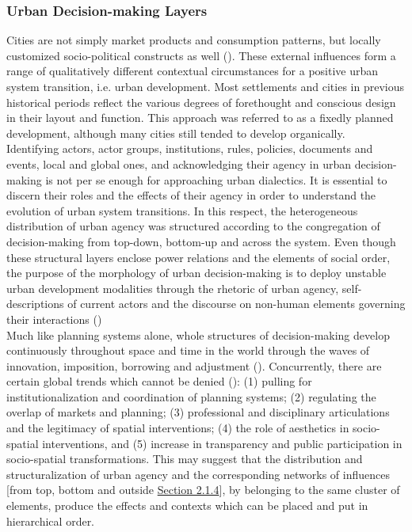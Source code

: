 \documentclass[11pt]{report}
\begin{document}
{{{\subsubsection{Urban Decision-making Layers}

Cities are not simply market products and consumption patterns, but locally customized socio-political constructs as well (\href{marcuse}{\citealt{marcus_spatial_2007}}). These external influences form a range of qualitatively different contextual circumstances for a positive urban system transition, i.e. urban development. Most settlements and cities in previous historical periods reflect the various degrees of forethought and conscious design in their layout and function. This approach was referred to as a fixedly planned development, although many cities still tended to develop organically.
\\

Identifying actors, actor groups, institutions, rules, policies, documents and events, local and global ones, and acknowledging their agency in urban decision-making is not per se enough for approaching urban dialectics.
It is essential to discern their roles and the effects of their agency in order to understand the evolution of urban system transitions.
In this respect, the heterogeneous distribution of urban agency was structured according to the congregation of decision-making from top-down, bottom-up and across the system.
Even though these structural layers enclose power relations and the elements of social order, the purpose of the morphology of urban decision-making is to deploy unstable urban development modalities 
through the rhetoric of urban agency, self-descriptions of current actors and the discourse on non-human elements governing their interactions (\href{Van}{\citealt{van_assche_co-evolutions_2013}})
\\

Much like planning systems alone, whole structures of decision-making develop continuously throughout space and time in the world through the waves of innovation,  imposition,  borrowing  and  adjustment
(\href{Nedovic}{\citealt{nedovicbudic_waves_2006}}).
Concurrently, there are certain global trends which cannot be denied
(\href{Van}{\citealt{van_assche_co-evolutions_2013}}):
(1) pulling for institutionalization and coordination of planning systems;
(2) regulating the overlap of markets and planning;
(3) professional and disciplinary articulations and the legitimacy of spatial interventions;
(4) the role of aesthetics in socio-spatial interventions, and
(5) increase in transparency and public participation in socio-spatial transformations.
This may suggest that the distribution and structuralization of urban agency and the corresponding networks of influences [from top, bottom and outside
\href{Section 2.1.4}{Section 2.1.4}], by belonging to the same cluster of elements, produce the effects and contexts which can be placed and put in hierarchical order. 
\\

}}}
\end{document}
